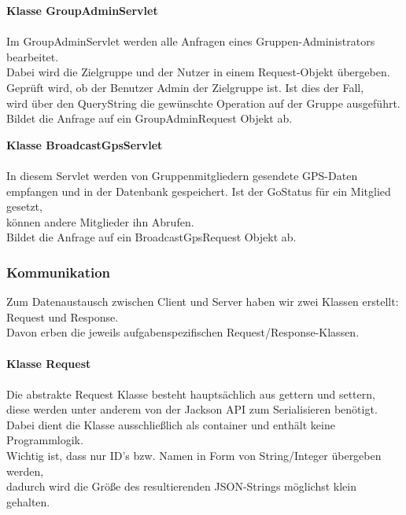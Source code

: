 \textbf{Klasse GroupAdminServlet} \\
\\
Im GroupAdminServlet werden alle Anfragen eines Gruppen-Administrators bearbeitet.\\
Dabei wird die Zielgruppe und der Nutzer in einem Request-Objekt übergeben.\\
Geprüft wird, ob der Benutzer Admin der Zielgruppe ist. Ist dies der Fall, \\
wird über den QueryString die gewünschte Operation auf der Gruppe ausgeführt.\\
Bildet die Anfrage auf ein GroupAdminRequest Objekt ab.

\textbf{Klasse BroadcastGpsServlet} \\
\\
In diesem Servlet werden von Gruppenmitgliedern gesendete GPS-Daten empfangen und in der
Datenbank gespeichert. Ist der GoStatus für ein Mitglied gesetzt,\\
können andere Mitglieder ihn Abrufen.\\
Bildet die Anfrage auf ein BroadcastGpsRequest Objekt ab.

\newpage
\subsubsection{Kommunikation}
Zum Datenaustausch zwischen Client und Server haben wir zwei Klassen erstellt:\\
Request und Response.\\
Davon erben die jeweils aufgabenspezifischen Request/Response-Klassen.\\
\\
\textbf{Klasse Request}\\
\\
Die abstrakte Request Klasse besteht hauptsächlich aus gettern und settern,\\
diese werden unter anderem von der Jackson API zum Serialisieren benötigt.\\
Dabei dient die Klasse ausschließlich als container und enthält keine Programmlogik.\\
Wichtig ist, dass nur ID's bzw. Namen in Form von String/Integer übergeben werden,\\
dadurch wird die Größe des resultierenden JSON-Strings möglichst klein gehalten.\\
\\ \\ \\

